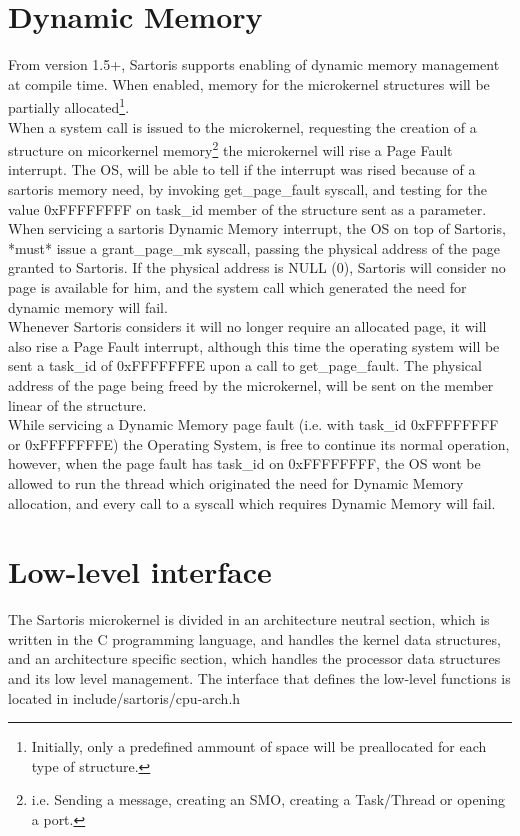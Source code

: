 \documentclass[11pt, letterpaper, twoside, english]{book}
\begin{document}
\section{Dynamic Memory} \label{sec:dynamicmemory}

From version 1.5+, Sartoris supports enabling of dynamic memory management at compile time. When enabled, memory for the microkernel structures will be partially allocated\footnote{Initially, only a predefined ammount of space will be preallocated for each type of structure.}.\\
When a system call is issued to the microkernel, requesting the creation of a structure on micorkernel memory\footnote{i.e. Sending a message, creating an SMO, creating a Task/Thread or opening a port.} the microkernel will rise a Page Fault interrupt. The OS, will be able to tell if the interrupt was rised because of a sartoris memory need, by invoking \textsf{get\_page\_fault} syscall, and testing for the value \textsf{0xFFFFFFFF} on task\_id member of the structure sent as a parameter. When servicing a sartoris Dynamic Memory interrupt, the OS on top of Sartoris, *must* issue a \textsf{grant\_page\_mk} syscall, passing the physical address of the page granted to Sartoris. If the physical address is NULL (0), Sartoris will consider no page is available for him, and the system call which generated the need for dynamic memory will fail.\\ 
Whenever Sartoris considers it will no longer require an allocated page, it will also rise a Page Fault interrupt, although this time the operating system will be sent a task\_id of 0xFFFFFFFE upon a call to \textsf{get\_page\_fault}. The physical address of the page being freed by the microkernel, will be sent on the member \textsf{linear} of the structure.\\
While servicing a Dynamic Memory page fault (i.e. with task\_id 0xFFFFFFFF or 0xFFFFFFFE) the Operating System, is free to continue its normal operation, however, when the page fault has task\_id on 0xFFFFFFFF, the OS wont be allowed to run the thread which originated the need for Dynamic Memory allocation, and every call to a syscall which requires Dynamic Memory will fail.

\section{Low-level interface} \label{sec:lowlevelinterface}

The Sartoris microkernel is divided in an architecture neutral section, which is written in the C programming language, and handles the kernel data structures, and an architecture specific section, which handles the processor data structures and its low level management. The interface that defines the low-level functions is located in \textsf{include/sartoris/cpu-arch.h}
\end{document}
